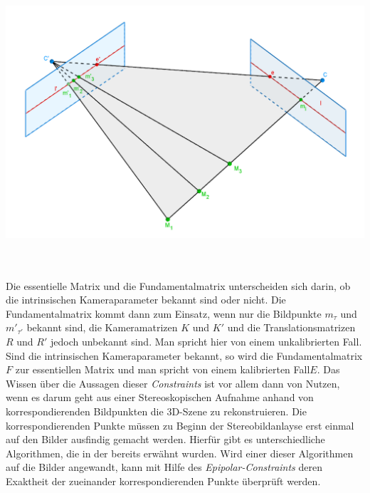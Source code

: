 \begin{minipage}{\linewidth}
	\centering
	\includegraphics[width=1.\linewidth]{images/EpipolarLinien.png}
	\label{fig:Epipolarconstraint}
\end{minipage}\\ \\

Die essentielle Matrix und die Fundamentalmatrix unterscheiden sich darin, ob die intrinsischen Kameraparameter bekannt sind oder nicht. Die Fundamentalmatrix kommt dann zum Einsatz, wenn nur die Bildpunkte $m_\tau$ und $m'_{\tau'}$ bekannt sind, die Kameramatrizen $K$ und $K'$ und die Translationsmatrizen $R$ und $R'$ jedoch unbekannt sind. Man spricht hier von einem unkalibrierten Fall\cite{HZ,ZZGXr,Ferid}. Sind die intrinsischen Kameraparameter bekannt, so wird die Fundamentalmatrix $F$ zur essentiellen Matrix und man spricht von einem kalibrierten Fall$E$\cite{HZ,Elements}. Das Wissen über die Aussagen dieser \textit{Constraints} ist vor allem dann von Nutzen, wenn es darum geht aus einer Stereoskopischen Aufnahme anhand von korrespondierenden Bildpunkten die 3D-Szene zu rekonstruieren. Die korrespondierenden Punkte müssen zu Beginn der Stereobildanlayse erst einmal auf den Bilder ausfindig gemacht werden. Hierfür gibt es unterschiedliche Algorithmen, die in der  bereits erwähnt wurden. Wird einer dieser Algorithmen auf die Bilder angewandt, kann mit Hilfe des \textit{Epipolar-Constraints} deren Exaktheit der zueinander korrespondierenden Punkte überprüft werden\cite{Elements,ZZGXr,HZ}. 

